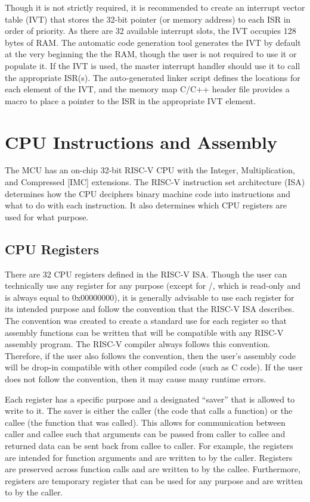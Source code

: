 \documentclass[11pt,pdftex,portrait,letterpaper]{article}
\begin{document}
Though it is not strictly required, it is recommended to create an interrupt vector table (IVT) that stores the 32-bit pointer (or memory address) to each ISR in order of priority. As there are 32 available interrupt slots, the IVT occupies 128 bytes of RAM. The automatic code generation tool generates the IVT by default at the very beginning the the RAM, though the user is not required to use it or populate it. If the IVT is used, the master interrupt handler should use it to call the appropriate ISR(s). The auto-generated linker script defines the locations for each element of the IVT, and the memory map C/C++ header file provides a macro to place a pointer to the ISR in the appropriate IVT element.

\newpage



\section{CPU Instructions and Assembly} \label{s:cpu-instructions}

The MCU has an on-chip 32-bit RISC-V CPU with the Integer, Multiplication, and Compressed [IMC] extensions. The RISC-V instruction set architecture (ISA) determines how the CPU deciphers binary machine code into instructions and what to do with each instruction. It also determines which CPU registers are used for what purpose.

\subsection{CPU Registers}

There are 32 CPU registers defined in the RISC-V ISA. Though the user can technically use any register for any purpose (except for /, which is read-only and is always equal to 0x00000000), it is generally advisable to use each register for its intended purpose and follow the convention that the RISC-V ISA describes. The convention was created to create a standard use for each register so that assembly functions can be written that will be compatible with any RISC-V assembly program. The RISC-V compiler always follows this convention. Therefore, if the user also follows the convention, then the user's assembly code will be drop-in compatible with other compiled code (such as C code). If the user does not follow the convention, then it may cause many runtime errors.

Each register has a specific purpose and a designated ``saver'' that is allowed to write to it. The saver is either the caller (the code that calls a function) or the callee (the function that was called). This allows for communication between caller and callee such that arguments can be passed from caller to callee and returned data can be sent back from callee to caller. For example, the registers  are intended for function arguments and are written to by the caller. Registers  are preserved across function calls and are written to by the callee. Furthermore, registers  are temporary register that can be used for any purpose and are written to by the caller.
\end{document}
